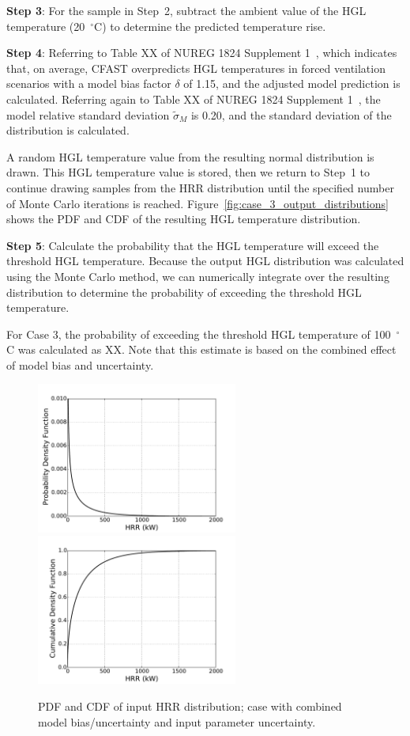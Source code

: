 \documentclass[12pt]{article}
\begin{document}
\textbf{Step 3}: For the sample in Step~2, subtract the ambient value of the HGL temperature (20~$^\circ$C) to determine the predicted temperature rise.

\textbf{Step 4}: Referring to Table XX of NUREG 1824 Supplement 1~\cite{NUREG_1824_Sup_1}, which indicates that, on average, CFAST overpredicts HGL temperatures in forced ventilation scenarios with a model bias factor $\delta$ of 1.15, and the adjusted model prediction is calculated. Referring again to Table XX of NUREG 1824 Supplement 1~\cite{NUREG_1824_Sup_1}, the model relative standard deviation $\widetilde\sigma_M$ is 0.20, and the standard deviation of the distribution is calculated.

A random HGL temperature value from the resulting normal distribution is drawn. This HGL temperature value is stored, then we return to Step~1 to continue drawing samples from the HRR distribution until the specified number of Monte Carlo iterations is reached. Figure~\ref{fig:case_3_output_distributions} shows the PDF and CDF of the resulting HGL temperature distribution.

\textbf{Step 5}: Calculate the probability that the HGL temperature will exceed the threshold HGL temperature. Because the output HGL distribution was calculated using the Monte Carlo method, we can numerically integrate over the resulting distribution to determine the probability of exceeding the threshold HGL temperature.

For Case 3, the probability of exceeding the threshold HGL temperature of 100~$^\circ$C was calculated as XX. Note that this estimate is based on the combined effect of model bias and uncertainty.


\clearpage


\begin{figure}[p]
\includegraphics[width=2.6in]{Figures/input_PDF}
\includegraphics[width=2.6in]{Figures/input_CDF}
\caption{PDF and CDF of input HRR distribution; case with combined model bias/uncertainty and input parameter uncertainty.}
\label{fig:case_3_input_distributions}
\end{figure}
\end{document}
